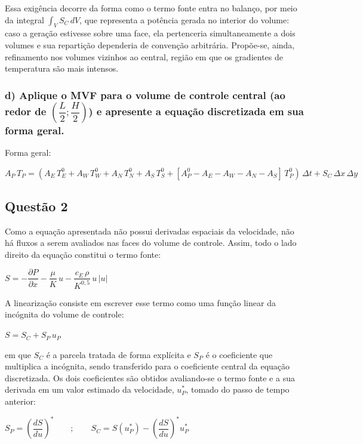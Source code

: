 Essa exigência decorre da forma como o termo fonte entra no balanço, por meio da integral $\int_{V}{S_{C}}\,dV$, que representa a potência gerada no interior do volume: caso a geração estivesse sobre uma face, ela pertenceria simultaneamente a dois volumes e sua repartição dependeria de convenção arbitrária. Propõe-se, ainda, refinamento nos volumes vizinhos ao central, região em que os gradientes de temperatura são mais intensos.

\subsubsection{d) Aplique o MVF para o volume de controle central (ao redor de $\left(\dfrac{L}{2};\dfrac{H}{2}\right)$) e apresente a equação discretizada em sua forma geral.}
Forma geral:


$A_{P}\,T_{P} = \left(A_{E}\,T_{E}^0 + A_{W}\,T_{W}^0 + A_{N}\,T_{N}^0 + A_{S}\,T_{S}^0 + \left[A_{P}^0 - A_{E} - A_{W} - A_{N} - A_{S}\right]\,T_{P}^0\right)\,\Delta t + S_{C}\,\Delta x\,\Delta y$


\subsection*{Questão 2}

Como a equação apresentada não possui derivadas espaciais da velocidade, não há fluxos a serem avaliados nas faces do volume de controle. Assim, todo o lado direito da equação constitui o termo fonte:

\begin{center}
    $S = -\dfrac{\partial P}{\partial x} - \dfrac{\mu}{K}\,u - \dfrac{c_{E}\,\rho}{K^{0,5}}\,u\,|u|$
\end{center}

A linearização consiste em escrever esse termo como uma função linear da incógnita do volume de controle:

\begin{center}
    $S = S_{C} + S_{P}\,u_{P}$
\end{center}

em que $S_{C}$ é a parcela tratada de forma explícita e $S_{P}$ é o coeficiente que multiplica a incógnita, sendo transferido para o coeficiente central da equação discretizada. Os dois coeficientes são obtidos avaliando-se o termo fonte e a sua derivada em um valor estimado da velocidade, $u_{P}^{*}$, tomado do passo de tempo anterior:

\begin{center}
    $S_{P} = \left(\dfrac{dS}{du}\right)^{*} \qquad ; \qquad S_{C} = S\left(u_{P}^{*}\right) - \left(\dfrac{dS}{du}\right)^{*}u_{P}^{*}$
\end{center}

